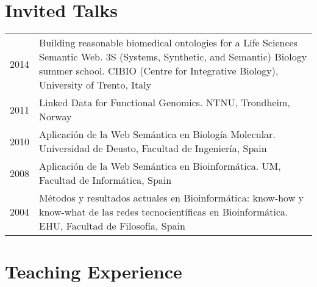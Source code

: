\documentclass[11pt,fullpage]{article}
\begin{document}

\section*{Invited Talks}

\begin{longtable}{p{0.5in}|p{5.5in}}


2014 & Building reasonable biomedical ontologies for a Life Sciences Semantic Web. 3S (Systems, Synthetic, and Semantic) Biology summer school. CIBIO (Centre for Integrative Biology), University of Trento, Italy \\

2011 & Linked Data for Functional Genomics. NTNU, Trondheim, Norway \\

2010 & Aplicaci\'on de la Web Sem\'antica en Biolog\'ia Molecular. Universidad de Deusto, Facultad de Ingenier\'ia, Spain \\

2008 & Aplicaci\'on de la Web Sem\'antica en Bioinform\'atica. UM, Facultad de Inform\'atica, Spain \\

2004 & M\'etodos y resultados actuales en Bioinform\'atica: know-how y know-what de las redes tecnocient\'ificas en Bioinform\'atica. EHU, Facultad de Filosof\'ia, Spain

\end{longtable}




\section*{Teaching Experience}
\end{document}
